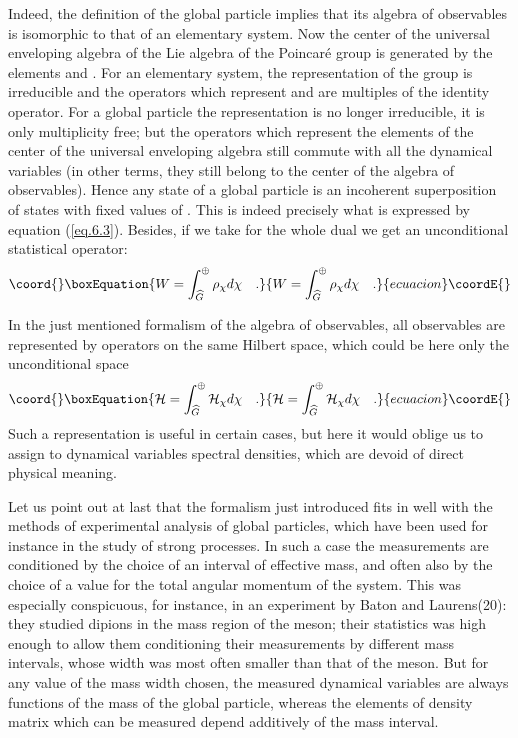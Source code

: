 \documentclass[a4paper,11pt]{article}
\begin{document}
Indeed, the definition of the global particle implies that its algebra of observables is 
isomorphic to that of an elementary system. Now the center of the universal enveloping algebra 
of the Lie algebra of the Poincar\'e  group is generated by the elements \coordHE{} and 
\coordHE{}. For an elementary system, the representation of the group is irreducible and 
the operators which represent \coordHE{} and \coordHE{} are multiples of the 
identity operator. For a global particle the representation is no longer irreducible, it is 
only multiplicity free; but the operators which 
represent the elements of the center of the universal enveloping algebra still commute with all 
the dynamical variables (in other terms, they still belong to the center of the algebra of 
observables). Hence any state of a global particle is an incoherent superposition of states 
with fixed values of \myHighlight{$\chi$}\coordHE{}. This is indeed precisely what is expressed by equation 
(\ref{eq.6.3}). 
Besides, if we take for \coordHE{} the whole dual we get an unconditional statistical operator:
\begin{equation}\coord{}\boxEquation{
 \label{eq.6.6}
       W = \int_{\Gc}^{\oplus} \rho_{\chi} d\chi   \quad .
}{
 W = \int_{\Gc}^{\oplus} \rho_{\chi} d\chi   \quad .
}{ecuacion}\coordE{}\end{equation}

In the just mentioned formalism of the algebra of observables, all observables are represented 
by operators on the same Hilbert space, which could be here only the unconditional space
\begin{equation}\coord{}\boxEquation{
 \label{eq.6.7}
    \mathcal{H} = \int_{\Gc}^{\oplus} \mathcal{H}_{\chi} d\chi   \quad .
}{
 \mathcal{H} = \int_{\Gc}^{\oplus} \mathcal{H}_{\chi} d\chi   \quad .
}{ecuacion}\coordE{}\end{equation}
Such a representation is useful in certain cases, but here it would oblige us to assign to 
dynamical variables spectral densities, which are devoid of direct physical meaning. 

Let us point out at last that the formalism just introduced fits in well with the methods of 
experimental analysis of global particles, which have been used for instance in the study of 
strong processes. In such a case the measurements are conditioned by the choice of an interval 
of effective mass, and often also by the choice of a value for the total angular momentum of 
the system. This was especially conspicuous, for instance, in an experiment by Baton and 
Laurens(20): they studied dipions \coordHE{} in the mass region of the \myHighlight{$\rho$}\coordHE{} meson; their 
statistics was 
high enough to allow them conditioning their measurements by different mass intervals, whose 
width was most often smaller than that of the \myHighlight{$\rho$}\coordHE{} meson. But for any value of the mass width 
chosen, the measured dynamical variables are always functions of the mass of the global 
particle, whereas the elements of density matrix which can be measured depend additively of the 
mass interval. 
\end{document}
